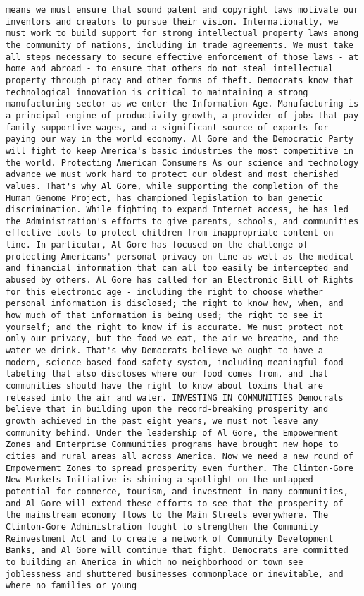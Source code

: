 \documentclass[
]{article}
\begin{document}
\begin{verbatim}
means we must ensure that sound patent and copyright laws motivate our inventors and creators to pursue their vision. Internationally, we must work to build support for strong intellectual property laws among the community of nations, including in trade agreements. We must take all steps necessary to secure effective enforcement of those laws - at home and abroad - to ensure that others do not steal intellectual property through piracy and other forms of theft. Democrats know that technological innovation is critical to maintaining a strong manufacturing sector as we enter the Information Age. Manufacturing is a principal engine of productivity growth, a provider of jobs that pay family-supportive wages, and a significant source of exports for paying our way in the world economy. Al Gore and the Democratic Party will fight to keep America's basic industries the most competitive in the world. Protecting American Consumers As our science and technology advance we must work hard to protect our oldest and most cherished values. That's why Al Gore, while supporting the completion of the Human Genome Project, has championed legislation to ban genetic discrimination. While fighting to expand Internet access, he has led the Administration's efforts to give parents, schools, and communities effective tools to protect children from inappropriate content on-line. In particular, Al Gore has focused on the challenge of protecting Americans' personal privacy on-line as well as the medical and financial information that can all too easily be intercepted and abused by others. Al Gore has called for an Electronic Bill of Rights for this electronic age - including the right to choose whether personal information is disclosed; the right to know how, when, and how much of that information is being used; the right to see it yourself; and the right to know if is accurate. We must protect not only our privacy, but the food we eat, the air we breathe, and the water we drink. That's why Democrats believe we ought to have a modern, science-based food safety system, including meaningful food labeling that also discloses where our food comes from, and that communities should have the right to know about toxins that are released into the air and water. INVESTING IN COMMUNITIES Democrats believe that in building upon the record-breaking prosperity and growth achieved in the past eight years, we must not leave any community behind. Under the leadership of Al Gore, the Empowerment Zones and Enterprise Communities programs have brought new hope to cities and rural areas all across America. Now we need a new round of Empowerment Zones to spread prosperity even further. The Clinton-Gore New Markets Initiative is shining a spotlight on the untapped potential for commerce, tourism, and investment in many communities, and Al Gore will extend these efforts to see that the prosperity of the mainstream economy flows to the Main Streets everywhere. The Clinton-Gore Administration fought to strengthen the Community Reinvestment Act and to create a network of Community Development Banks, and Al Gore will continue that fight. Democrats are committed to building an America in which no neighborhood or town see joblessness and shuttered businesses commonplace or inevitable, and where no families or young 
\end{verbatim}
\end{document}
